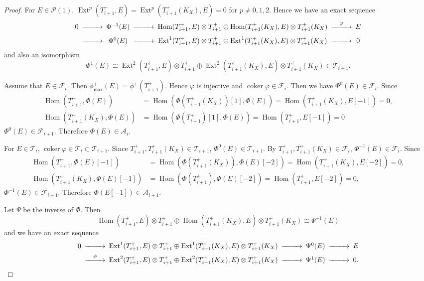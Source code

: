 \documentclass[leqno,11pt]{amsart}
\def\Ext{\mathop{\mathrm{Ext}}\nolimits}
\def\Hom{\mathop{\mathrm{Hom}}\nolimits}
\def\coker{\mathop{\mathrm{coker}}\nolimits}
\theoremstyle{definition}
\def\AA{\ensuremath{\mathcal A}}
\def\FF{\ensuremath{\mathcal F}}
\def\PP{\ensuremath{\mathcal P}}
\def\TT{\ensuremath{\mathcal T}}
\begin{document}
\begin{proof}
For $E \in \PP(1)$, 
$\Ext^p(T_{i+1}^+,E)=\Ext^p(T_{i+1}^+(K_X),E)=0$ for $p \ne 0,1,2$.
Hence we have an exact sequence
\begin{equation}
\begin{CD}
0 @>>> \Phi^{-1}(E) @>>> \Hom(T_{i+1}^+,E) \otimes T_{i+1}^+ \oplus  
\Hom(T_{i+1}^+(K_X),E) \otimes T_{i+1}^+ (K_X) @>{\varphi}>> E \\
 @>>> \Phi^0(E) @>>> \Ext^1(T_{i+1}^+,E) \otimes T_{i+1}^+ \oplus  
\Ext^1(T_{i+1}^+(K_X),E) \otimes T_{i+1}^+ (K_X) @>>> 0
\end{CD}
\end{equation}
and also an isomorphism
\begin{equation}
\Phi^1(E) \cong \Ext^2(T_{i+1}^+,E) \otimes T_{i+1}^+\oplus  
\Ext^2(T_{i+1}^+(K_X),E) \otimes T_{i+1}^+ (K_X) \in \TT_{i+1}.
\end{equation}

Assume that $E \in \FF_i$. Then
$\phi_{\max}^+(E)=\phi^+(T_{i+1}^+)$. Hence 
$\varphi$ is injective and $\coker \varphi \in \FF_i$. 
Then we have $\Phi^0(E) \in \FF_i$.
Since 
\begin{equation}
\begin{split}
\Hom(T_{i+1}^+,\Phi(E))& =\Hom(\Phi(T_{i+1}^+(K_X))[1],\Phi(E))
=\Hom(T_{i+1}^+(K_X),E[-1])=0,\\
\Hom(T_{i+1}^+(K_X),\Phi(E))&=\Hom(\Phi(T_{i+1}^+)[1],\Phi(E))
=\Hom(T_{i+1}^+,E[-1])=0
\end{split}
\end{equation}
$\Phi^0(E) \in \FF_{i+1}$.
Therefore $\Phi(E) \in \AA_i$.

For $E \in \TT_i$, 
$\coker \varphi \in \TT_i \subset \TT_{i+1}$.
Since $T_{i+1}^+, T_{i+1}^+ (K_X)\in \TT_{i+1}$,
$\Phi^0(E) \in \TT_{i+1}$.
By $T_{i+1}^+,T_{i+1}^+(K_X) \in \FF_i$, $\Phi^{-1}(E) \in \FF_i$.
Since 
\begin{equation}
\begin{split}
\Hom(T_{i+1}^+,\Phi(E)[-1])& =\Hom(\Phi(T_{i+1}^+(K_X)),\Phi(E)[-2])
=\Hom(T_{i+1}^+(K_X),E[-2])=0,\\
\Hom(T_{i+1}^+(K_X),\Phi(E)[-1])&=\Hom(\Phi(T_{i+1}^+),\Phi(E)[-2])
=\Hom(T_{i+1}^+,E[-2])=0,
\end{split}
\end{equation}
$\Phi^{-1}(E) \in \FF_{i+1}$.
Therefore $\Phi(E[-1]) \in \AA_{i+1}$.



Let $\Psi$ be the inverse of $\Phi$.
Then
\begin{equation}\label{eq:Psi-1}
\Hom(T_{i+1}^+,E) \otimes T_{i+1}^+ \oplus
\Hom(T_{i+1}^+(K_X),E) \otimes T_{i+1}^+(K_X) \cong \Psi^{-1}(E)
\end{equation}
and we have an exact sequence
\begin{equation}
\begin{CD}
0 @>>> \Ext^1(T_{i+1}^+,E) \otimes T_{i+1}^+ \oplus
\Ext^1(T_{i+1}^+(K_X),E) \otimes T_{i+1}^+(K_X) @>>> \Psi^0(E) @>>>E \\
 @>{\psi}>> \Ext^2(T_{i+1}^+,E) \otimes T_{i+1}^+ \oplus
\Ext^2(T_{i+1}^+(K_X),E) \otimes T_{i+1}^+(K_X) @>>> \Psi^1(E) @>>>0.
\end{CD}
\end{equation}


\end{proof}
\end{document}
